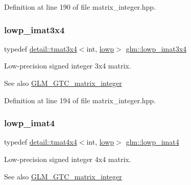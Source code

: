 Definition at line 190 of file matrix\+\_\+integer.\+hpp.

\mbox{\label{group__gtc__matrix__integer_gaba7c2c9f782278aaa10dad882d73ef0d}} 
\subsubsection{\texorpdfstring{lowp\+\_\+imat3x4}{lowp\_imat3x4}}
{\footnotesize\ttfamily typedef \hyperlink{structglm_1_1detail_1_1tmat3x4}{detail\+::tmat3x4}$<$int, \hyperlink{namespaceglm_a0f04f086094c747d227af4425893f545ae161af3fc695e696ce3bf69f7332bc2d}{lowp}$>$ \hyperlink{group__gtc__matrix__integer_gaba7c2c9f782278aaa10dad882d73ef0d}{glm\+::lowp\+\_\+imat3x4}}

Low-\/precision signed integer 3x4 matrix. \begin{DoxySeeAlso}{See also}
\hyperlink{group__gtc__matrix__integer}{G\+L\+M\+\_\+\+G\+T\+C\+\_\+matrix\+\_\+integer} 
\end{DoxySeeAlso}


Definition at line 194 of file matrix\+\_\+integer.\+hpp.

\mbox{\label{group__gtc__matrix__integer_ga7c687f14d923e05d5cf14aac41d10993}} 
\subsubsection{\texorpdfstring{lowp\+\_\+imat4}{lowp\_imat4}}
{\footnotesize\ttfamily typedef \hyperlink{structglm_1_1detail_1_1tmat4x4}{detail\+::tmat4x4}$<$int, \hyperlink{namespaceglm_a0f04f086094c747d227af4425893f545ae161af3fc695e696ce3bf69f7332bc2d}{lowp}$>$ \hyperlink{group__gtc__matrix__integer_ga7c687f14d923e05d5cf14aac41d10993}{glm\+::lowp\+\_\+imat4}}

Low-\/precision signed integer 4x4 matrix. \begin{DoxySeeAlso}{See also}
\hyperlink{group__gtc__matrix__integer}{G\+L\+M\+\_\+\+G\+T\+C\+\_\+matrix\+\_\+integer} 
\end{DoxySeeAlso}


